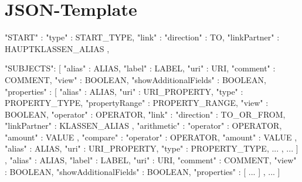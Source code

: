 \thispagestyle{empty}
\Hack{\enlargethispage{5\baselineskip}}
\section{JSON-Template}\label{json}

%

 \begin{myVerbatim}
 {
   "START" : {
     "type" : START_TYPE, 
     "link" : {
       "direction"   : TO, 
       "linkPartner" : HAUPTKLASSEN_ALIAS
     }
   },
  
   "SUBJECTS": [  
     {
       "alias"                : ALIAS,
       "label"                : LABEL,
       "uri"                  : URI,     
       "comment"              : COMMENT,
       "view"                 : BOOLEAN,
       "showAdditionalFields" : BOOLEAN,
       "properties"           : [
         { "alias"         : ALIAS,
 	  "uri"           : URI_PROPERTY,
 	  "type"          : PROPERTY_TYPE,     
           "propertyRange" : PROPERTY_RANGE,          
           "view"          : BOOLEAN,
           "operator"      : OPERATOR,          
           "link"          : {
 	    "direction"     : TO_OR_FROM, 
 	    "linkPartner"   : KLASSEN_ALIAS
 	  },
           "arithmetic"    : {
 	    "operator"      : OPERATOR, 
 	    "amount"        : VALUE
 	  },
           "compare"       : {
 	    "operator"      : OPERATOR, 
 	    "amount"        : VALUE
 	  }
         },
         { "alias"         : ALIAS,
 	  "uri"           : URI_PROPERTY,
 	  "type"          : PROPERTY_TYPE,
           ...
         }, 
 	  ...
       ]     
     },                       
     {
       "alias"                : ALIAS,
       "label"                : LABEL,
       "uri"                  : URI,     
       "comment"              : COMMENT,
       "view"                 : BOOLEAN,
       "showAdditionalFields" : BOOLEAN,
       "properties"           : [ ... ]
     },
       ...
   ]
 }
 \end{myVerbatim}